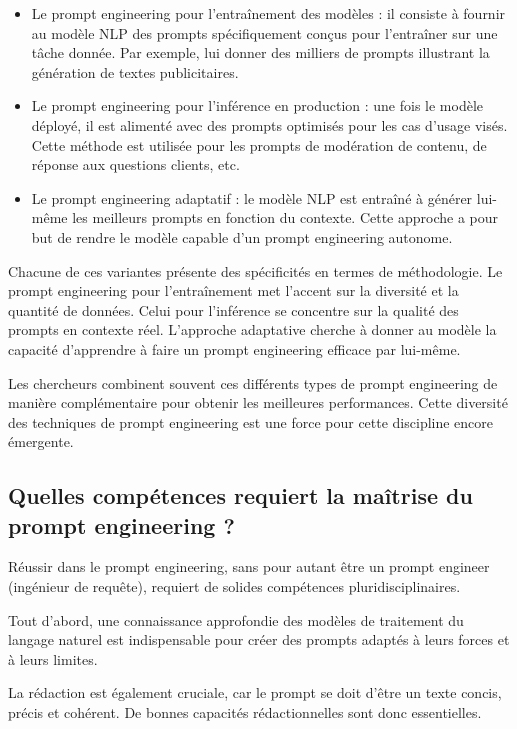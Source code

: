 \begin{itemize}
	\item Le prompt engineering pour l’entraînement des modèles : il consiste à fournir
		au modèle NLP des prompts spécifiquement conçus pour l’entraîner sur une tâche
		donnée. Par exemple, lui donner des milliers de prompts illustrant la génération
		de textes publicitaires.

	\item Le prompt engineering pour l’inférence en production : une fois le modèle
		déployé, il est alimenté avec des prompts optimisés pour les cas d’usage
		visés. Cette méthode est utilisée pour les prompts de modération de contenu,
		de réponse aux questions clients, etc.

	\item Le prompt engineering adaptatif : le modèle NLP est entraîné à générer lui-même
		les meilleurs prompts en fonction du contexte. Cette approche a pour but de
		rendre le modèle capable d’un prompt engineering autonome.
\end{itemize}

Chacune de ces variantes présente des spécificités en termes de méthodologie. Le
prompt engineering pour l’entraînement met l’accent sur la diversité et la quantité
de données. Celui pour l’inférence se concentre sur la qualité des prompts en
contexte réel. L’approche adaptative cherche à donner au modèle la capacité d’apprendre
à faire un prompt engineering efficace par lui-même.

Les chercheurs combinent souvent ces différents types de prompt engineering de manière
complémentaire pour obtenir les meilleures performances. Cette diversité des
techniques de prompt engineering est une force pour cette discipline encore
émergente.

\subsection*{Quelles compétences requiert la maîtrise du prompt engineering ?}

Réussir dans le prompt engineering, sans pour autant être un prompt engineer (ingénieur
de requête), requiert de solides compétences pluridisciplinaires.

Tout d’abord, une connaissance approfondie des modèles de traitement du langage
naturel est indispensable pour créer des prompts adaptés à leurs forces et à
leurs limites.

La rédaction est également cruciale, car le prompt se doit d’être un texte concis,
précis et cohérent. De bonnes capacités rédactionnelles sont donc essentielles.

